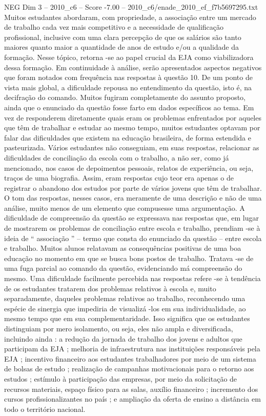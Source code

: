 \begin{textsample}{NEG Dim 3 – 2010\_c6 – Score -7.00 – 2010\_c6/enade\_2010\_ef\_f7b5697295.txt}
Muitos estudantes abordaram, com propriedade, a associação entre um mercado de trabalho cada vez mais competitivo e a necessidade de qualificação profissional, inclusive com uma clara percepção de que os salários são tanto maiores quanto maior a quantidade de anos de estudo e/ou a qualidade da formação.
Nesse tópico, retorna -se ao papel crucial da EJA como viabilizadora dessa formação.
Em continuidade à análise, serão apresentados aspectos negativos que foram notados com frequência nas respostas à questão 10.
De um ponto de vista mais global, a dificuldade repousa no entendimento da questão, isto é, na decifração do comando.
Muitos fugiram completamente do assunto proposto, ainda que o enunciado da questão fosse farto em dados específicos ao tema.
Em vez de responderem diretamente quais eram os problemas enfrentados por aqueles que têm de trabalhar e estudar ao mesmo tempo, muitos estudantes optavam por falar das dificuldades que existem na educação brasileira, de forma estendida e pasteurizada.
Vários estudantes não conseguiam, em suas respostas, relacionar as dificuldades de conciliação da escola com o trabalho, a não ser, como já mencionado, nos casos de depoimentos pessoais, relatos de experiência, ou seja, traços de uma biografia.
Assim, eram respostas cujo teor era apenas o de registrar o abandono dos estudos por parte de vários jovens que têm de trabalhar.
O tom das respostas, nesses casos, era meramente de uma descrição e não de uma análise, muito menos de um elemento que compusesse uma argumentação.
A dificuldade de compreensão da questão se expressava nas respostas que, em lugar de mostrarem os problemas de conciliação entre escola e trabalho, prendiam -se à ideia de “ associação ” – termo que consta do enunciado da questão – entre escola e trabalho.
Muitos alunos relatavam as consequências positivas de uma boa educação no momento em que se busca bons postos de trabalho.
Tratava -se de uma fuga parcial ao comando da questão, evidenciando má compreensão do mesmo.
Uma dificuldade facilmente percebida nas respostas refere -se à tendência de os estudantes tratarem dos problemas relativos à escola e, muito separadamente, daqueles problemas relativos ao trabalho, reconhecendo uma espécie de sinergia que impediria de visualizá -los em sua individualidade, ao mesmo tempo que em sua complementaridade.
Isso significa que os estudantes distinguiam por mero isolamento, ou seja, eles não ampla e diversificada, incluindo ainda : a redução da jornada de trabalho dos jovens e adultos que participam da EJA ; melhoria de infraestrutura nas instituições responsáveis pela EJA ; incentivo financeiro aos estudantes trabalhadores por meio de um sistema de bolsas de estudo ; realização de campanhas motivacionais para o retorno aos estudos ; estímulo à participação das empresas, por meio da solicitação de recursos materiais, espaço físico para as salas, auxílio financeiro ; incremento dos cursos profissionalizantes no país ; e ampliação da oferta de ensino a distância em todo o território nacional.

\end{textsample}
